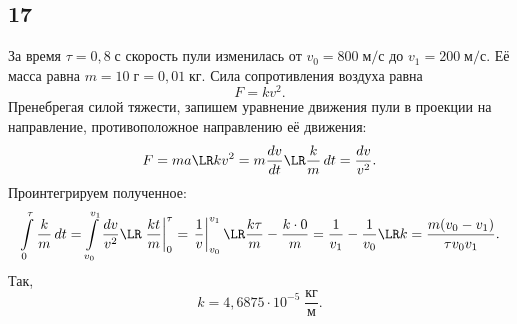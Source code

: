 \subsection{17}

За время $\tau=0{,}8\;\text{с}$ скорость пули изменилась от $v_0=800\;\text{м/с}$ до $v_1=200\;\text{м/с}$. Её масса равна $m=10\;\text{г}=0{,}01\;\text{кг}$. Сила сопротивления воздуха равна
\[
F=kv^2.
\]
Пренебрегая силой тяжести, запишем уравнение движения пули в проекции на направление, противоположное направлению её движения:
\[
F=ma\LR kv^2=m\frac{dv}{dt}\LR \frac{k}{m}\,dt=\frac{dv}{v^2}.
\]
Проинтегрируем полученное:
\[
\int\limits_0^\tau\frac{k}{m}\,dt=\int\limits_{v_0}^{v_1}\frac{dv}{v^2}\LR\left.\frac{kt}{m}\right\vert_0^\tau=\left.\frac{1}{v}\right\vert_{v_0}^{v_1}\LR\frac{k\tau}{m}-\frac{k\cdot0}{m}=\frac{1}{v_1}-\frac{1}{v_0}\LR k=\frac{m(v_0-v_1)}{\tau v_0v_1}.
\]
Так,
\[
k=4{,}6875\cdot10^{-5}\;\frac{\text{кг}}{\text{м}}.
\]